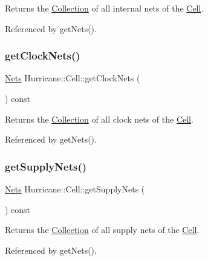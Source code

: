 Returns the \hyperlink{classHurricane_1_1Collection}{Collection} of all internal nets of the \hyperlink{classHurricane_1_1Cell}{Cell}. 

Referenced by get\+Nets().

\mbox{\label{classHurricane_1_1Cell_a306f28990f9fd4ccee0e9e8ebecf98fc}} 
\subsubsection{\texorpdfstring{get\+Clock\+Nets()}{getClockNets()}}
{\footnotesize\ttfamily \hyperlink{namespaceHurricane_a3404a8b17130a1824f4a281704b04df7}{Nets} Hurricane\+::\+Cell\+::get\+Clock\+Nets (\begin{DoxyParamCaption}{ }\end{DoxyParamCaption}) const}

Returns the \hyperlink{classHurricane_1_1Collection}{Collection} of all clock nets of the \hyperlink{classHurricane_1_1Cell}{Cell}. 

Referenced by get\+Nets().

\mbox{\label{classHurricane_1_1Cell_ac51c8f16de7a4af86feead9f1aecf494}} 
\subsubsection{\texorpdfstring{get\+Supply\+Nets()}{getSupplyNets()}}
{\footnotesize\ttfamily \hyperlink{namespaceHurricane_a3404a8b17130a1824f4a281704b04df7}{Nets} Hurricane\+::\+Cell\+::get\+Supply\+Nets (\begin{DoxyParamCaption}{ }\end{DoxyParamCaption}) const}

Returns the \hyperlink{classHurricane_1_1Collection}{Collection} of all supply nets of the \hyperlink{classHurricane_1_1Cell}{Cell}. 

Referenced by get\+Nets().

\mbox{\label{classHurricane_1_1Cell_ac438b5b6b8dbcd868d6bf0deeb469444}} 
